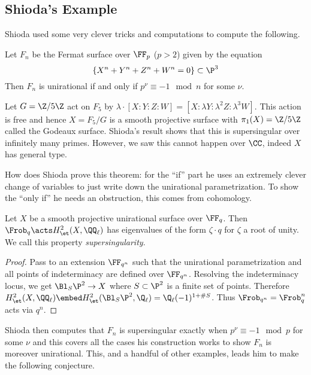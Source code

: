\documentclass[12pt]{article}
\begin{document}
\subsection{Shioda's Example}

Shioda used some very clever tricks and computations to compute the following.

\begin{theorem}[Shioda]
Let $F_n$ be the Fermat surface over $\FF_p$ ($p > 2$) given by the equation
\[ \{ X^n + Y^n + Z^n + W^n = 0 \} \subset \P^3 \]
Then $F_n$ is unirational if and only if $p^\nu \equiv -1 \mod n$ for some $\nu$.
\end{theorem}

\begin{example}
Let $G = \Z / 5 \Z$ act on $F_5$ by $\lambda \cdot [X : Y : Z : W] = [X : \lambda Y : \lambda^2 Z : \lambda^3 W]$. This action is free and hence $X = F_5 / G$ is a smooth projective surface with $\pi_1(X) = \Z / 5 \Z$ called the Godeaux surface. Shioda's result shows that this is supersingular over infinitely many primes. However, we saw this cannot happen over $\CC$, indeed $X$ has general type. 
\end{example}

How does Shioda prove this theorem: for the ``if'' part he uses an extremely clever change of variables to just write down the unirational parametrization. To show the ``only if'' he needs an obstruction, this comes from \etale cohomology. 

\begin{prop}
Let $X$ be a smooth projective unirational surface over $\FF_q$. Then $\Frob_q \acts H^2_{\et}(X, \QQ_\ell)$ has eigenvalues of the form $\zeta \cdot q$ for $\zeta$ a root of unity. We call this property \textit{supersingularity}. 
\end{prop}

\begin{proof}
Pass to an extension $\FF_{q^n}$ such that the unirational parametrization and all points of indeterminacy are defined over $\FF_{q^n}$. Resolving the indeterminacy locus, we get $\Bl_S \P^2 \to X$ where $S \subset \P^2$ is a finite set of points. Therefore $H^2_{\et}(X, \QQ_\ell) \embed H^2_{\et}(\Bl_S \P^2, \Q_\ell) = \Q_\ell(-1)^{1 + \# S}$. Thus $\Frob_{q^n} = \Frob_{q}^n$ acts via $q^n$.  
\end{proof}

Shioda then computes that $F_n$ is supersingular exactly when $p^\nu \equiv - 1 \mod p$ for some $\nu$ and this covers all the cases his construction works to show $F_n$ is moreover unirational. This, and a handful of other examples, leads him to make the following conjecture.
\end{document}
